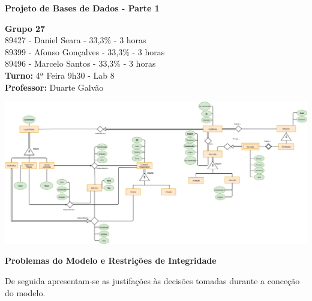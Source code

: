 \documentclass[10pt]{report}
\begin{document}
    \begin{titlepage}
        \begin{center}

            \vspace*{\fill}
            \Huge
            \textbf{Projeto de Bases de Dados - Parte 1}
            
            \vspace*{\fill}

            \Large
            \textbf{Grupo 27} \\
            89427 - Daniel Seara - 33,3\% - 3 horas \\
            89399 - Afonso Gonçalves - 33,3\% - 3 horas \\
            89496 - Marcelo Santos - 33,3\% - 3 horas \\

            \bigskip
            \textbf{Turno:} 4ª Feira 9h30 - Lab 8\\ \textbf{Professor:} Duarte Galvão
        
        \end{center}
\end{titlepage}

\begin{center}
    \vspace*{-2cm}
    \includegraphics[width=1.4\textwidth, angle=90]{BDProj1.jpg}
\end{center}
\newpage

    \LARGE
    \begin{center}
        \textbf{Problemas do Modelo e Restrições de Integridade}
    \end{center}

    \bigskip
    \bigskip

    \normalsize

    \noindent De seguida apresentam-se as justifações às decisões tomadas durante a conceção do modelo. 
\end{document}
